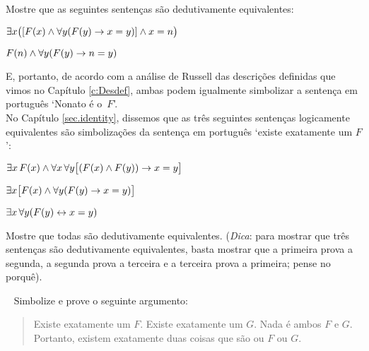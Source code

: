\problempart
Mostre que as seguintes sentenças são dedutivamente equivalentes:
\begin{ebullet}
\item $\exists x \bigl([\mathord{F}(x) \wedge \forall y (\mathord{F}(y) \rightarrow x = y)] \wedge x = n\bigr)$
\item $\mathord{F}(n) \wedge \forall y (\mathord{F}(y) \rightarrow n= y)$
\end{ebullet}

E, portanto, de acordo com a análise de Russell das descrições definidas que vimos no Capítulo \ref{c:Desdef}, ambas podem igualmente simbolizar a sentença em português `Nonato é o~$F$'.\\

\problempart
No Capítulo   \ref{sec.identity}, dissemos que as três seguintes sentenças logicamente equivalentes  são simbolizações da sentença em português `existe exatamente um $F$':
\begin{ebullet}
\item $\exists x\,\mathord{F}(x) \wedge \forall x\, \forall y \bigl[(\mathord{F}(x) \wedge \mathord{F}(y)) \rightarrow x = y\bigr]$
\item $\exists x \bigl[\mathord{F}(x) \wedge \forall y (\mathord{F}(y) \rightarrow x = y)\bigr]$
\item $\exists x\, \forall y (\mathord{F}(y) \leftrightarrow x = y)$
\end{ebullet}
Mostre que todas são dedutivamente equivalentes. (\emph{Dica}: para mostrar que três sentenças são dedutivamente equivalentes, basta mostrar que a  primeira  prova a segunda, a segunda prova a terceira e a terceira prova a primeira; pense no porquê).

\
\problempart
Simbolize e prove o seguinte argumento:
	\begin{quote}
		Existe exatamente um $F$. Existe exatamente um $G$. Nada é ambos $F$ e $G$. Portanto, existem exatamente duas coisas que  são ou $F$ ou $G$.
	\end{quote}
 




